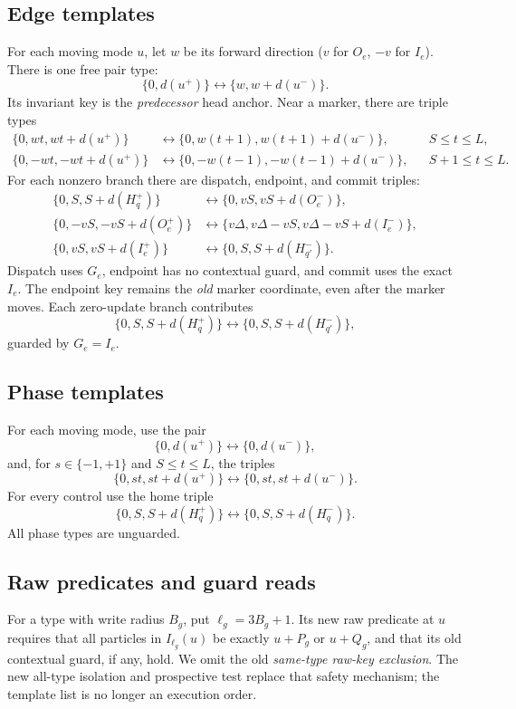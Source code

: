 \documentclass[11pt,a4paper]{article}
\numberwithin{equation}{section}
\begin{document}
\subsection{Edge templates}
For each moving mode $u$, let $w$ be its forward direction ($v$ for $O_e$, $-v$ for $I_e$). There is one free pair type:
\begin{equation}\label{fpa:pi:eq:free}
 \{0,d(u^+)\}\longleftrightarrow\{w,w+d(u^-)\}.
\end{equation}
Its invariant key is the \emph{predecessor} head anchor. Near a marker, there are triple types
\begin{align}
 \{0,wt,wt+d(u^+)\}&\longleftrightarrow
 \{0,w(t+1),w(t+1)+d(u^-)\},&&S\le t\le L,\label{fpa:pi:eq:behind}\\
 \{0,-wt,-wt+d(u^+)\}&\longleftrightarrow
 \{0,-w(t-1),-w(t-1)+d(u^-)\},&&S+1\le t\le L.\label{fpa:pi:eq:ahead}
\end{align}
For each nonzero branch there are dispatch, endpoint, and commit triples:
\begin{align}
 \{0,S,S+d(H_q^+)\}&\longleftrightarrow
 \{0,vS,vS+d(O_e^-)\},\label{fpa:pi:eq:dispatch}\\
 \{0,-vS,-vS+d(O_e^+)\}&\longleftrightarrow
 \{v\Delta,v\Delta-vS,v\Delta-vS+d(I_e^-)\},\label{fpa:pi:eq:endpoint}\\
 \{0,vS,vS+d(I_e^+)\}&\longleftrightarrow
 \{0,S,S+d(H_{q'}^-)\}.\label{fpa:pi:eq:commit}
\end{align}
Dispatch uses $G_e$, endpoint has no contextual guard, and commit uses the exact $I_e$. The endpoint key remains the \emph{old} marker coordinate, even after the marker moves. Each zero-update branch contributes
\begin{equation}\label{fpa:pi:eq:direct}
 \{0,S,S+d(H_q^+)\}\longleftrightarrow
 \{0,S,S+d(H_{q'}^-)\},
\end{equation}
guarded by $G_e=I_e$.

\subsection{Phase templates}
For each moving mode, use the pair
\[
 \{0,d(u^+)\}\longleftrightarrow\{0,d(u^-)\},
\]
and, for $s\in\{-1,+1\}$ and $S\le t\le L$, the triples
\[
 \{0,st,st+d(u^+)\}\longleftrightarrow
 \{0,st,st+d(u^-)\}.
\]
For every control use the home triple
\[
 \{0,S,S+d(H_q^+)\}\longleftrightarrow
 \{0,S,S+d(H_q^-)\}.
\]
All phase types are unguarded.

\subsection{Raw predicates and guard reads}
For a type with write radius $B_g$, put $\ell_g=3B_g+1$. Its new raw predicate at $u$ requires that all particles in $I_{\ell_g}(u)$ be exactly $u+P_g$ or $u+Q_g$, and that its old contextual guard, if any, hold. We omit the old \emph{same-type raw-key exclusion}. The new all-type isolation and prospective test replace that safety mechanism; the template list is no longer an execution order.
\end{document}
